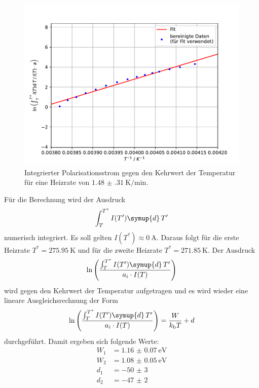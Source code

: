 \begin{figure}[h!]
  \centering
  \includegraphics[scale=0.8]{fig/plot6.pdf}
  \caption{Integrierter Polarisationsstrom gegen den Kehrwert der Temperatur für eine Heizrate von $\SI{1.48(31)}{\kelvin\per\minute}$.}
  \label{fig:6}
\end{figure}
\FloatBarrier
Für die Berechnung wird der Ausdruck
\begin{align*}
      \int_T^{T^*} I(T') \symup{d}\,T'
\end{align*}
numerisch integriert. Es soll gelten $I(T^*)\approx\SI{0}{\ampere}$. Daraus folgt für die erste Heizrate $T^*=\SI{275.95}{\kelvin}$ und für die zweite Heizrate $T^*=\SI{271.85}{\kelvin}$.
Der Ausdruck
\begin{align*}
   \ln\left(\frac{\int_T^{T^*} I(T') \symup{d}\,T'}{a_i \cdot I(T)}\right)
\end{align*}
wird gegen den Kehrwert der Temperatur aufgetragen und es wird wieder eine lineare Ausgleichsrechnung der Form
\begin{equation*}
  \ln\left(\frac{\int_T^{T^*} I(T') \symup{d}\,T'}{a_i \cdot I(T)}\right)=\dfrac{W}{k_\mathrm{b}T}+d
\end{equation*}
durchgeführt. Damit ergeben sich folgende Werte:
\begin{align*}
    W_\mathrm{1} &= \SI{1.16(7)}{\electronvolt} \\
    W_\mathrm{2} &= \SI{1.08(5)}{\electronvolt} \\
    d_\mathrm{1} &= \num{-50(3)} \\
    d_\mathrm{2} &= \num{-47(2)}
\end{align*}
